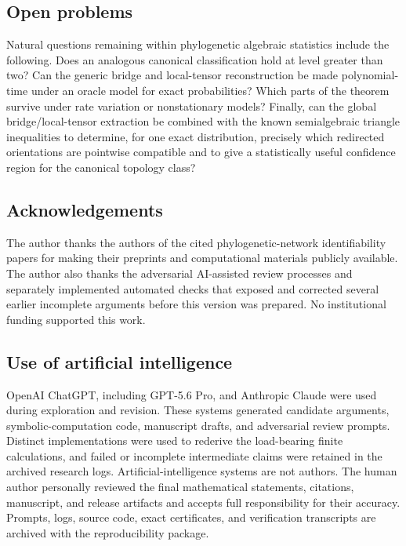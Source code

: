 \subsection{Open problems}

Natural questions remaining within phylogenetic algebraic statistics include the following.  Does an analogous canonical classification hold at level greater than two?  Can the generic bridge and local-tensor reconstruction be made polynomial-time under an oracle model for exact probabilities?  Which parts of the theorem survive under rate variation or nonstationary models?  Finally, can the global bridge/local-tensor extraction be combined with the known semialgebraic triangle inequalities to determine, for one exact distribution, precisely which redirected orientations are pointwise compatible and to give a statistically useful confidence region for the canonical topology class?

\subsection*{Acknowledgements}

The author thanks the authors of the cited phylogenetic-network identifiability papers for making their preprints and computational materials publicly available.  The author also thanks the adversarial AI-assisted review processes and separately implemented automated checks that exposed and corrected several earlier incomplete arguments before this version was prepared.  No institutional funding supported this work.

\subsection*{Use of artificial intelligence}

OpenAI ChatGPT, including GPT-5.6 Pro, and Anthropic Claude were used during exploration and revision.  These systems generated candidate arguments, symbolic-computation code, manuscript drafts, and adversarial review prompts.  Distinct implementations were used to rederive the load-bearing finite calculations, and failed or incomplete intermediate claims were retained in the archived research logs.  Artificial-intelligence systems are not authors.  The human author personally reviewed the final mathematical statements, citations, manuscript, and release artifacts and accepts full responsibility for their accuracy.  Prompts, logs, source code, exact certificates, and verification transcripts are archived with the reproducibility package.

